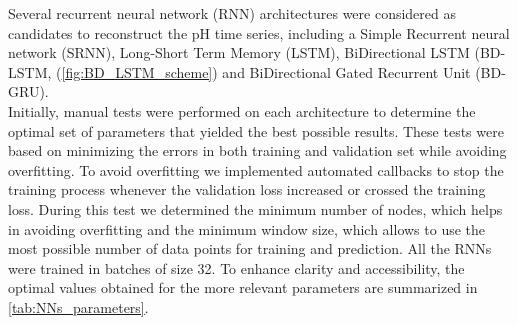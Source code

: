 Several recurrent neural network (RNN) architectures were considered as
candidates to reconstruct the pH time series, including a Simple Recurrent
neural network (SRNN), Long-Short Term Memory (LSTM), BiDirectional LSTM
(BD-LSTM, (\cref{fig:BD_LSTM_scheme}) and BiDirectional Gated Recurrent Unit
(BD-GRU).\\
Initially, manual tests were performed on each architecture to determine
the optimal set of parameters that yielded the best possible results. These
tests were based on minimizing the errors in both training and validation set
while avoiding overfitting. To avoid overfitting we implemented automated
callbacks to stop the training process whenever the validation loss increased
or crossed the training loss. During this test we determined the minimum number
of nodes, which helps in avoiding overfitting and the minimum window size,
which allows to use the most possible number of data points for training and
prediction. All the RNNs were trained in batches of size 32. To enhance clarity
and accessibility, the optimal values obtained for the more relevant parameters
are summarized in \cref{tab:NNs_parameters}.
\begin{table}[H]
    \centering
    \caption[Optimal parameters used for the different RNN
        architectures]{Optimal parameters used for the different RNN
        architectures}
    \label{tab:NNs_parameters}
\end{table}
